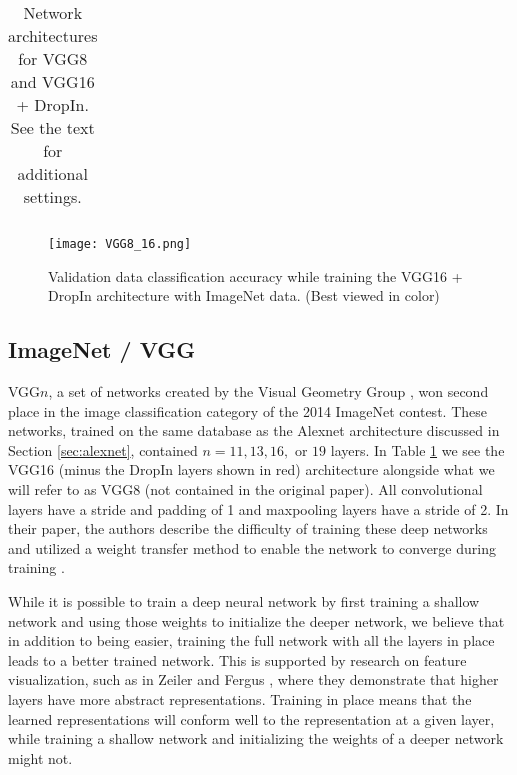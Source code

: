 \documentclass[10pt,twocolumn,letterpaper]{article}
\newcommand{\dropin}{DropIn }
\newcommand{\dropinNS}{DropIn}
\begin{document}
\begin{table}[htb]
\begin{center}
\begin{tabular}{| c | c |}
  \end{tabular}
  \caption{Network architectures for VGG8 and VGG16 + \dropinNS.  See the text for additional settings.}
  \label{tab:vgg_dropin}
\end{center}
  \vspace{-15pt}
\end{table}



\begin{figure}[]
\begin{center}
   \texttt{[image: VGG8\_16.png]}
\end{center}
  \vspace{-15pt}
   \caption{Validation data classification accuracy while training the VGG16 + \dropin architecture with ImageNet data. (Best viewed in color)
}
\label{fig:vgg_plot}
  \vspace{-10pt}
\end{figure}



\subsection{ImageNet / VGG}
\label{sec:vgg}
VGG$n$, a set of networks created by the Visual Geometry Group \cite{simonyan2014very}, won second place in the image classification category of the 2014 ImageNet contest.  These networks, trained on the same database as the Alexnet architecture discussed in Section \ref{sec:alexnet}, contained $ n=11,13,16,\mbox{ or }19$ layers.  In Table \ref{tab:vgg_dropin} we see the VGG16 (minus the \dropin layers shown in red) architecture alongside what we will refer to as VGG8 (not contained in the original paper).
All convolutional layers have a stride and padding of 1 and maxpooling layers have a stride of 2. 
In their paper, the authors describe the difficulty of training these deep networks and utilized a weight transfer method to enable the network to converge during training \cite{simonyan2014very}.


While it is possible to train a deep neural network by first training a shallow network and using those weights to initialize the deeper network, we believe that in addition to being easier, training the full network with all the layers in place leads to a better trained network.  This is supported by research on feature visualization, such as in Zeiler and Fergus \cite{zeiler2014visualizing}, where they demonstrate that higher layers have more abstract representations.
Training in place means that the learned representations will conform well to the representation at a given layer, while training a shallow network and initializing the weights of a deeper network might not.
\end{document}
